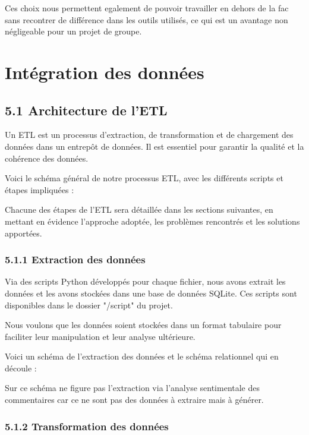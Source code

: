 Ces choix nous permettent egalement de pouvoir travailler en dehors de la fac sans recontrer de différence dans les outils utilisés, ce qui est un avantage non négligeable pour un projet de groupe.

\chapter*{Intégration des données}


\section*{5.1 Architecture de l’ETL}

Un ETL est un processus d’extraction, de transformation et de chargement des données dans un entrepôt de données. Il est essentiel pour garantir la qualité et la cohérence des données.

Voici le schéma général de notre processus ETL, avec les différents scripts et étapes impliquées :


Chacune des étapes de l’ETL sera détaillée dans les sections suivantes, en mettant en évidence l'approche adoptée, les problèmes rencontrés et les solutions apportées.

\subsection{5.1.1 Extraction des données}

Via des scripts Python développés pour chaque fichier, nous avons extrait les données et les avons stockées dans une base de données SQLite.
Ces scripts sont disponibles dans le dossier "/script" du projet.

Nous voulons que les données soient stockées dans un format tabulaire pour faciliter leur manipulation et leur analyse ultérieure.

Voici un schéma de l'extraction des données et le schéma relationnel qui en découle :


Sur ce schéma ne figure pas l'extraction via l'analyse sentimentale des commentaires car ce ne sont pas des données à extraire mais à générer.


\subsection{5.1.2 Transformation des données}

